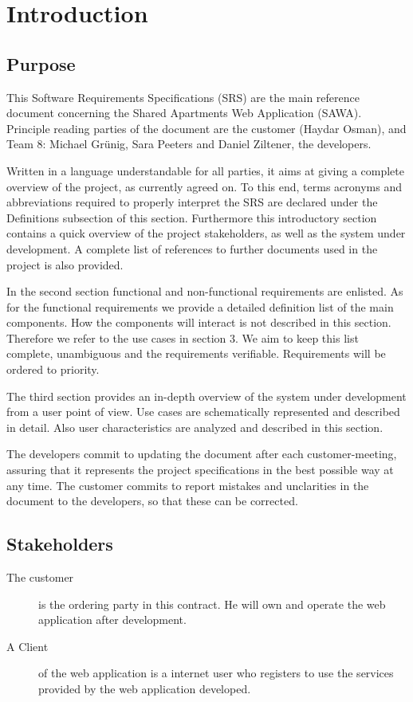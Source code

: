 \documentclass[a4wide]{article}
\title{}
\author{}
\begin{document}

\tableofcontents
\clearpage
\section{Introduction}
\subsection{Purpose}
This Software Requirements Specifications (SRS) are the main reference document concerning the Shared Apartments Web Application (SAWA). Principle reading parties of the document are the customer (Haydar Osman), and Team 8: Michael Grünig, Sara Peeters and Daniel Ziltener, the developers.

Written in a language understandable for all parties, it aims at giving a complete overview of the project, as currently agreed on. To this end, terms acronyms and abbreviations required to properly interpret the SRS are declared under the Definitions subsection of this section. Furthermore this introductory section contains a quick overview of the project stakeholders, as well as the system under development. A complete list of references to further documents used in the project is also provided.

In the second section functional and non-functional requirements are enlisted. As for the functional requirements we provide a detailed definition list of the main components. How the components will interact is not described in this section. Therefore we refer to the use cases in section 3. We aim to keep this list complete, unambiguous and the requirements verifiable. Requirements will be ordered to priority.

The third section provides an in-depth overview of the system under development from a user point of view. Use cases are schematically represented and described in detail. Also user characteristics are analyzed and described in this section.


The developers commit to updating the document after each customer-meeting, assuring that it represents the project specifications in the best possible way at any time. The customer commits to report mistakes and unclarities in the document to the developers, so that these can be corrected.

\subsection{Stakeholders}
\begin{description}
\item[The customer]is the ordering party in this contract.  He will own and operate the web application after development. 
\item[A Client] of the web application is a internet user who registers to use the services provided by the web application developed.
\end{description}
\end{document}
